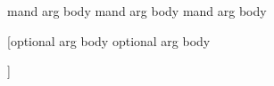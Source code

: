 \mycommand

{mand arg body
	mand arg body
	mand arg body

}

%

[optional arg body
	optional arg body

]
